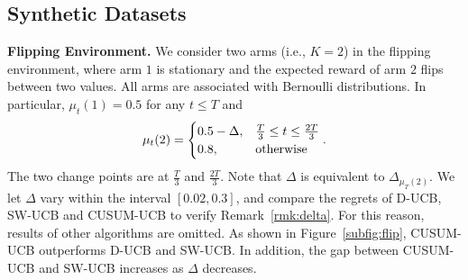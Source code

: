 \documentclass[letterpaper]{article} %
\begin{document}
\subsection{Synthetic Datasets}
{\bf Flipping Environment.}
We consider two arms (i.e., $K=2$) in the flipping environment, where arm $1$ is stationary and the expected reward of arm $2$ flips between two values. All arms are associated with Bernoulli distributions. In particular, $\mu_t(1)=0.5$ for any $t\leq T$ and 
\begin{eqnarray}\label{eqn:flip}
\mu_t(2)=
\begin{cases}
0.5-\Delta, &\frac{T}{3}\leq t\leq\frac{2T}{3}\cr
0.8, &\text{otherwise}
\end{cases}.
\end{eqnarray}
The two change points are at $\frac{T}{3}$ and $\frac{2T}{3}$. Note that $\Delta$ is equivalent to $\Delta_{\mu_T(2)}$.
We let $\Delta$ vary within the interval $[0.02,0.3]$, and compare the
regrets of D-UCB, SW-UCB and CUSUM-UCB to verify Remark~\ref{rmk:delta}. For this reason, results of other algorithms are omitted.
As shown in Figure~\ref{subfig:flip}, CUSUM-UCB outperforms D-UCB and SW-UCB. In addition, the gap between CUSUM-UCB and SW-UCB increases as $\Delta$ decreases.%

\end{document}
